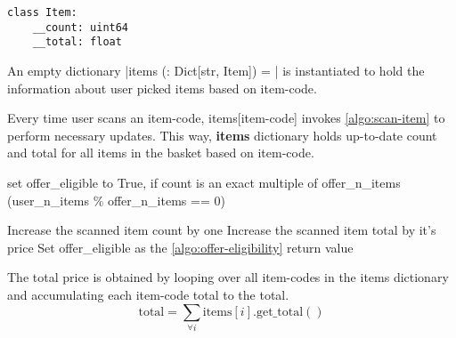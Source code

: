 \documentclass[11pt,a4paper,oneside,onecolumn]{article}
\begin{document}
\begin{verbatim}
class Item:
    __count: uint64
    __total: float
\end{verbatim}

 An empty dictionary
  |items (: Dict[str, Item]) = {}|
 is instantiated to hold the information about user picked items based on item-code.

Every time user scans an item-code, items[item-code] invokes \cref{algo:scan-item} to
perform necessary updates.
This way, \textbf{items} dictionary holds up-to-date count and total for all items
in the basket based on item-code.

\begin{algorithm}[H]
\DontPrintSemicolon
\SetAlgoLined
\caption{Check if eligible for offer at present}
\label{algo:offer-eligibility}


 {
 set offer\_eligible to True, if count is an exact multiple of offer\_n\_items
	(user\_n\_items \% offer\_n\_items == 0)\;
 }
\end{algorithm}

\begin{algorithm}[H]
\DontPrintSemicolon
\SetAlgoLined
\caption{Scan an item and update necessary details}
\label{algo:scan-item}


 Increase the scanned item count by one\;
 Increase the scanned item total by it's price\;
 Set offer\_eligible as the \cref{algo:offer-eligibility} return value\;

\end{algorithm}


The total price is obtained by looping over all item-codes in the items dictionary and
accumulating each item-code total to the total.
\begin{equation}
\mathrm{total} = \sum_{\forall i}\mathrm{items}[i].\mathrm{get\_total()}
\end{equation}
\end{document}
